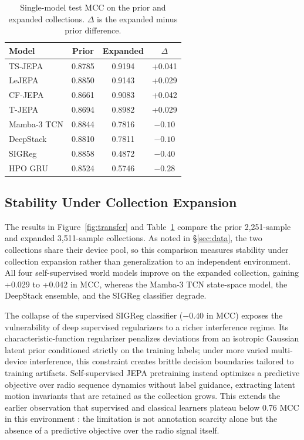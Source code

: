 \begin{table}[t]
    \caption{Single-model test \ac{MCC} on the prior and expanded collections. $\Delta$ is the expanded minus prior difference.}
    \label{tab:single}
    \centering
    \small
    \begin{tabular}{lccc}
        \toprule
        Model & Prior & Expanded & $\Delta$ \\
        \midrule
        TS-JEPA        & 0.8785 & 0.9194 & +0.041 \\
        LeJEPA         & 0.8850 & 0.9143 & +0.029 \\
        CF-JEPA        & 0.8661 & 0.9083 & +0.042 \\
        T-JEPA         & 0.8694 & 0.8982 & +0.029 \\
        Mamba-3 TCN    & 0.8844 & 0.7816 & $-0.10$ \\
        DeepStack      & 0.8810 & 0.7811 & $-0.10$ \\
        SIGReg         & 0.8858 & 0.4872 & $-0.40$ \\
        HPO GRU        & 0.8524 & 0.5746 & $-0.28$ \\
        \bottomrule
    \end{tabular}
\end{table}

\subsection{Stability Under Collection Expansion}
\label{sec:expansion}

The results in Figure~\ref{fig:transfer} and Table~\ref{tab:single} compare the prior 2,251-sample and expanded 3,511-sample collections. As noted in \S\ref{sec:data}, the two collections share their device pool, so this comparison measures stability under collection expansion rather than generalization to an independent environment. All four self-supervised world models improve on the expanded collection, gaining +0.029 to +0.042 in \ac{MCC}, whereas the Mamba-3 TCN state-space model, the DeepStack ensemble, and the SIGReg classifier degrade.

The collapse of the supervised SIGReg classifier ($-0.40$ in \ac{MCC}) exposes the vulnerability of deep supervised regularizers to a richer interference regime. Its characteristic-function regularizer penalizes deviations from an isotropic Gaussian latent prior conditioned strictly on the training labels; under more varied multi-device interference, this constraint creates brittle decision boundaries tailored to training artifacts. Self-supervised \ac{JEPA} pretraining instead optimizes a predictive objective over radio sequence dynamics without label guidance, extracting latent motion invariants that are retained as the collection grows. This extends the earlier observation that supervised and classical learners plateau below 0.76 \ac{MCC} in this environment \cite{ribeiro2026eucnc}: the limitation is not annotation scarcity alone but the absence of a predictive objective over the radio signal itself.


